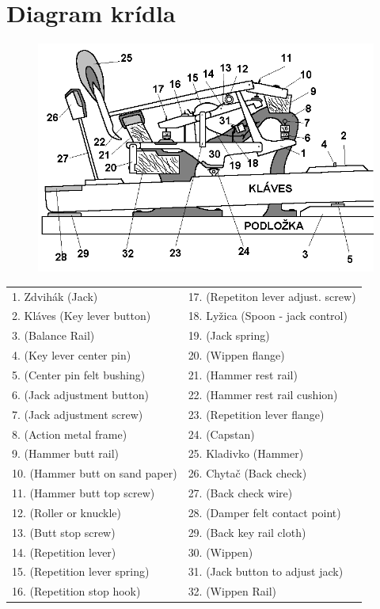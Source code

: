 \documentclass[11pt,a4paper]{book}
\begin{document}
\section{Diagram krídla}\label{s:grand-diagram}
\begin{figure}[ht]
\centering
\includegraphics[scale=1]{figures/GrandActionSK.png}
\end{figure}
\begin{longtable}[c]{@{}ll@{}}
\toprule
1. Zdvihák (Jack) & 17. (Repetiton lever adjust. screw)\tabularnewline
2. Kláves (Key lever button) & 18. Lyžica (Spoon - jack control)\tabularnewline
3. (Balance Rail) & 19. (Jack spring)\tabularnewline
4. (Key lever center pin) & 20. (Wippen flange)\tabularnewline
5. (Center pin felt bushing) & 21. (Hammer rest rail)\tabularnewline
6. (Jack adjustment button) & 22. (Hammer rest rail cushion)\tabularnewline
7. (Jack adjustment screw) & 23. (Repetition lever flange)\tabularnewline
8. (Action metal frame) & 24. (Capstan)\tabularnewline
9. (Hammer butt rail) & 25. Kladivko (Hammer)\tabularnewline
10. (Hammer butt on sand paper) & 26. Chytač (Back check)\tabularnewline
11. (Hammer butt top screw) & 27. (Back check wire)\tabularnewline
12. (Roller or knuckle) & 28. (Damper felt contact point)\tabularnewline
13. (Butt stop screw) & 29. (Back key rail cloth)\tabularnewline
14. (Repetition lever) & 30. (Wippen)\tabularnewline
15. (Repetition lever spring) & 31. (Jack button to adjust jack)\tabularnewline
16. (Repetition stop hook) & 32. (Wippen Rail)\tabularnewline
\bottomrule
\end{longtable}

%
%
\end{document}
